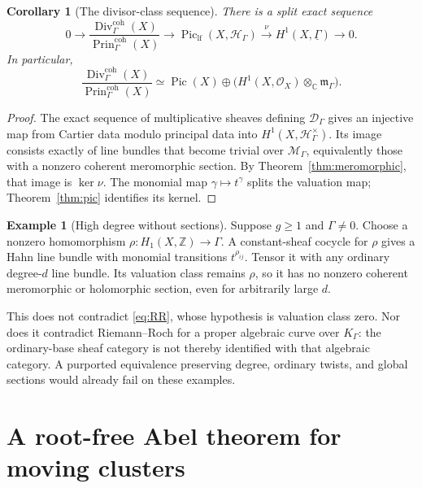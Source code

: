 \documentclass[11pt,letterpaper]{article}
\numberwithin{equation}{section}
\newtheorem{corollary}[theorem]{Corollary}
\theoremstyle{definition}
\newtheorem{example}[theorem]{Example}
\theoremstyle{remark}
\newcommand{\C}{\mathbb C}
\newcommand{\Z}{\mathbb Z}
\newcommand{\HH}{\mathcal H}
\newcommand{\MM}{\mathscr M}
\newcommand{\OO}{\mathcal O}
\newcommand{\mm}{\mathfrak m}
\newcommand{\Pic}{\operatorname{Pic}}
\newcommand{\Piclf}{\operatorname{Pic}_{\mathrm{lf}}}
\newcommand{\Div}{\operatorname{Div}}
\newcommand{\Prin}{\operatorname{Prin}}
\newcommand{\Hg}{\HH_\Gamma}
\newcommand{\Mg}{\MM_\Gamma}
\newcommand{\Kg}{K_\Gamma}
\newcommand{\mg}{\mm_\Gamma}
\newcommand{\vclass}{\nu}
\newcommand{\ot}{\otimes_{\C}}
\begin{document}
\begin{corollary}[The divisor-class sequence]
\label{cor:divseq}
There is a split exact sequence
\begin{equation}
 0\longrightarrow
 \frac{\Div_\Gamma^{\mathrm{coh}}(X)}{\Prin_\Gamma^{\mathrm{coh}}(X)}
 \longrightarrow \Piclf(X,\Hg)
 \xrightarrow{\vclass}H^1(X,\underline\Gamma)
 \longrightarrow0.
 \label{eq:divseq}
\end{equation}
In particular,
\begin{equation}
 \frac{\Div_\Gamma^{\mathrm{coh}}(X)}{\Prin_\Gamma^{\mathrm{coh}}(X)}
 \simeq\Pic(X)\oplus\bigl(H^1(X,\OO_X)\ot\mg\bigr).
 \label{eq:divclass}
\end{equation}
\end{corollary}
\begin{proof}
The exact sequence of multiplicative sheaves defining
$\mathscr D_\Gamma$ gives an injective map from Cartier data modulo
principal data into $H^1(X,\Hg^\times)$. Its image consists exactly of
line bundles that become trivial over $\Mg$, equivalently those with a
nonzero coherent meromorphic section. By
Theorem~\ref{thm:meromorphic}, that image is $\ker\vclass$.
The monomial map $\gamma\mapsto t^\gamma$ splits the valuation map;
Theorem~\ref{thm:pic} identifies its kernel.
\end{proof}

\begin{example}[High degree without sections]
\label{ex:monodromy}
Suppose $g\ge1$ and $\Gamma\ne0$. Choose a nonzero homomorphism
$\rho:H_1(X,\Z)\to\Gamma$. A constant-sheaf cocycle for $\rho$ gives
a Hahn line bundle with monomial transitions $t^{\rho_{ij}}$.
Tensor it with any ordinary degree-$d$ line bundle. Its valuation class
remains $\rho$, so it has no nonzero coherent meromorphic or holomorphic
section, even for arbitrarily large $d$.

This does not contradict \eqref{eq:RR}, whose hypothesis is valuation
class zero. Nor does it contradict Riemann--Roch for a proper algebraic
curve over $\Kg$: the ordinary-base sheaf category is not thereby
identified with that algebraic category. A purported equivalence
preserving degree, ordinary twists, and global sections would already
fail on these examples.
\end{example}

\section{A root-free Abel theorem for moving clusters}
\label{sec:abel}
\end{document}
